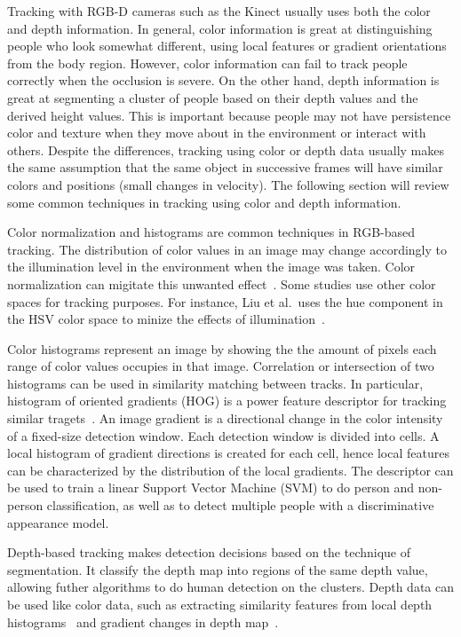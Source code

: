 Tracking with RGB-D cameras such as the Kinect usually uses both the color and depth information. In general, color information is great at distinguishing people who look somewhat different, using local features or gradient orientations from the body region. However, color information can fail to track people correctly when the occlusion is severe. On the other hand, depth information is great at segmenting a cluster of people based on their depth values and the derived height values. This is important because people may not have persistence color and texture when they move about in the environment or interact with others. Despite the differences, tracking using color or depth data usually makes the same assumption that the same object in successive frames will have similar colors and positions (small changes in velocity). The following section will review some common techniques in tracking using color and depth information.

Color normalization and histograms are common techniques in RGB-based tracking. The distribution of color values in an image may change accordingly to the illumination level in the environment when the image was taken. Color normalization can migitate this unwanted effect~\cite{reinhard_color_transfers}. Some studies use other color spaces for tracking purposes. For instance, Liu et al.\ uses the hue component in the HSV color space to minize the effects of illumination~\cite{liu_tracking_with_pei}.

Color histograms represent an image by showing the the amount of pixels each range of color values occupies in that image. Correlation or intersection of two histograms can be used in similarity matching between tracks. In particular, histogram of oriented gradients (HOG) is a power feature descriptor for tracking similar tragets~\cite{dalal_hog, dollar_pedestrian_detection, munaro_tracking_within_groups_with_mobile_robot, luber_rgbd_boosted_models}. An image gradient is a directional change in the color intensity of a fixed-size detection window. Each detection window is divided into cells. A local histogram of gradient directions is created for each cell, hence local features can be characterized by the distribution of the local gradients. The descriptor can be used to train a linear Support Vector Machine (SVM) to do person and non-person classification, as well as to detect multiple people with a discriminative appearance model.

Depth-based tracking makes detection decisions based on the technique of segmentation. It classify the depth map into regions of the same depth value, allowing futher algorithms to do human detection on the clusters. Depth data can be used like color data, such as extracting similarity features from local depth histograms~\cite{ikemura_depth_simialrity_features} and gradient changes in depth map~\cite{spinello_depth_gradients}.

